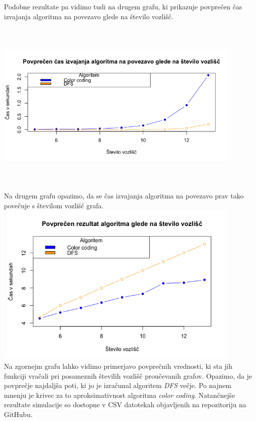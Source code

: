 \documentclass[a4paper, 9pt]{article}
\begin{document}
Podobne rezultate pa vidimo tudi na drugem grafu, ki prikazuje povprečen čas izvajanja algoritma na povezavo glede na število vozlišč. \\
\includegraphics[width = 12cm, height = 9cm]{sim.png}\\
Na drugem grafu opazimo, da se čas izvajanja algoritma na povezavo prav tako povečuje s številom vozlišč grafa. \\
\includegraphics[width =12cm, height = 8cm]{povprecje_pot.png}\\
Na zgornejm grafu lahko vidimo primerjavo povprečnih vrednosti, ki sta jih funkciji vračali pri posameznih številih vozlišč proučevanih grafov. Opazimo, da je povprečje najdaljša poti, ki jo je izračunal algoritem \textit{DFS} večje. Po najnem mnenju je krivec za to aproksimativnost algoritma \textit{color coding}.
Natančnejše rezultate simulacije so dostopne v CSV datotekah objavljenih na repozitoriju na GitHubu.
\end{document}
